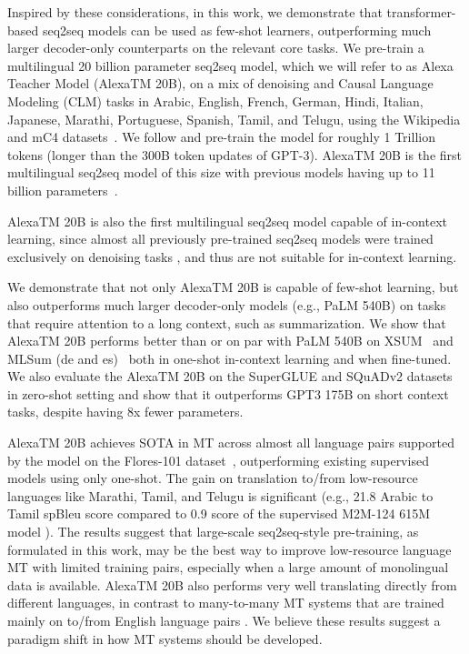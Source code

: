 Inspired by these considerations, in this work, we demonstrate that transformer-based seq2seq models can be used as few-shot learners, outperforming much larger decoder-only counterparts on the relevant core tasks. We pre-train a multilingual 20 billion parameter seq2seq model, which we will refer to as Alexa Teacher Model ({AlexaTM 20B}), on a mix of denoising and Causal Language Modeling (CLM) tasks in Arabic, English, French, German, Hindi, Italian, Japanese, Marathi, Portuguese, Spanish, Tamil, and Telugu, using the Wikipedia and mC4 datasets~\citep{Xue2021mT5AM}. We follow \cite{Hoffmann2022TrainingCL} and pre-train the model for roughly 1 Trillion tokens (longer than the 300B token updates of GPT-3). {AlexaTM 20B} is the first multilingual seq2seq model of this size with previous models having up to 11 billion parameters~\citep{Xue2021mT5AM}. 

{AlexaTM 20B} is also the first multilingual seq2seq model capable of in-context learning, since almost all previously pre-trained seq2seq models were trained exclusively on denoising tasks \citep{Raffel2020ExploringTL,Lewis2020BARTDS,Xue2021mT5AM}, and thus are not suitable for in-context learning. 

We demonstrate that not only AlexaTM 20B is capable of few-shot learning, but also outperforms much larger decoder-only models (e.g., PaLM 540B) on tasks that require attention to a long context, such as summarization. We show that {AlexaTM 20B} performs better than or on par with PaLM 540B on XSUM~\citep{Narayan2018DontGM} and MLSum (de and es)~\citep{Scialom2020MLSUMTM} both in one-shot in-context learning and when fine-tuned. We also evaluate the {AlexaTM 20B} on the SuperGLUE and SQuADv2 datasets in zero-shot setting and show that it outperforms GPT3 175B on short context tasks, despite having 8x fewer parameters.

{AlexaTM 20B} achieves SOTA in MT across almost all language pairs supported by the model on the Flores-101 dataset~\citep{Goyal2022TheFE}, outperforming existing supervised models using only one-shot. The gain on translation to/from low-resource languages like Marathi, Tamil, and Telugu is significant (e.g., 21.8 Arabic to Tamil spBleu score compared to 0.9 score of the supervised M2M-124 615M model \citep{Goyal2022TheFE}). The results  suggest that large-scale seq2seq-style pre-training, as formulated in this work, may be the best way to improve low-resource language MT with limited training pairs, especially when a large amount of monolingual data is available. {AlexaTM 20B} also performs very well translating directly from different languages, in contrast to many-to-many MT systems that are trained mainly on to/from English language pairs \citep{Fan2021BeyondEM}. We believe these results suggest a paradigm shift in how MT systems should be developed.

